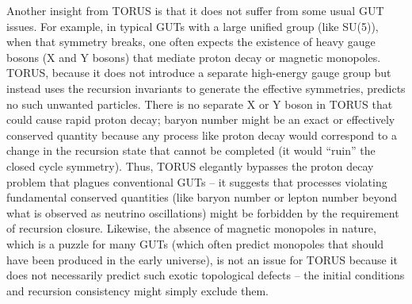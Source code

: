 \documentclass[]{article}
\begin{document}
Another insight from TORUS is that it does not suffer from some usual
GUT issues. For example, in typical GUTs with a large unified group
(like SU(5)), when that symmetry breaks, one often expects the existence
of heavy gauge bosons (X and Y bosons) that mediate proton decay or
magnetic monopoles. TORUS, because it does not introduce a separate
high-energy gauge group but instead uses the recursion invariants to
generate the effective symmetries, predicts no such unwanted particles.
There is no separate X or Y boson in TORUS that could cause rapid proton
decay; baryon number might be an exact or effectively conserved quantity
because any process like proton decay would correspond to a change in
the recursion state that cannot be completed (it would ``ruin'' the
closed cycle symmetry). Thus, TORUS elegantly bypasses the proton decay
problem that plagues conventional GUTs -- it suggests that processes
violating fundamental conserved quantities (like baryon number or lepton
number beyond what is observed as neutrino oscillations) might be
forbidden by the requirement of recursion closure. Likewise, the absence
of magnetic monopoles in nature, which is a puzzle for many GUTs (which
often predict monopoles that should have been produced in the early
universe), is not an issue for TORUS because it does not necessarily
predict such exotic topological defects -- the initial conditions and
recursion consistency might simply exclude them.
\end{document}
